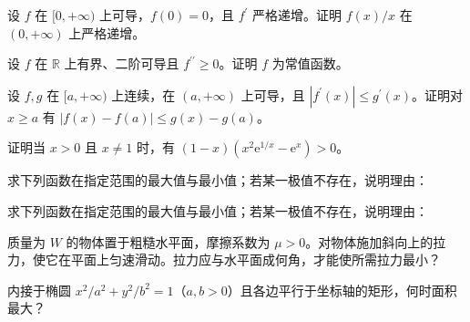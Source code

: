 \noindent\begin{minipage}{\textwidth}
设 $f$ 在 $[0,+\infty)$ 上可导，$f(0)=0$，且 $f^{\prime}$ 严格递增。证明 $f(x)/x$ 在 $(0,+\infty)$ 上严格递增。
\end{minipage}\par\vfill
\noindent\begin{minipage}{\textwidth}
设 $f$ 在 $\mathbb R$ 上有界、二阶可导且 $f^{\prime\prime}\ge0$。证明 $f$ 为常值函数。
\end{minipage}\par\vfill
\newpage
\noindent\begin{minipage}{\textwidth}
设 $f,g$ 在 $[a,+\infty)$ 上连续，在 $(a,+\infty)$ 上可导，且 $|f^{\prime}(x)|\le g^{\prime}(x)$。证明对 $x\ge a$ 有 $|f(x)-f(a)|\le g(x)-g(a)$。
\end{minipage}\par\vfill
\noindent\begin{minipage}{\textwidth}
证明当 $x>0$ 且 $x\ne1$ 时，有 $(1-x)(x^2\mathrm e^{1/x}-\mathrm e^x)>0$。
\end{minipage}\par\vfill
\noindent\begin{minipage}{\textwidth}
求下列函数在指定范围的最大值与最小值；若某一极值不存在，说明理由：
\end{minipage}\par\vfill
\newpage
\noindent\begin{minipage}{\textwidth}
求下列函数在指定范围的最大值与最小值；若某一极值不存在，说明理由：
\end{minipage}\par\vfill
\noindent\begin{minipage}{\textwidth}
质量为 $W$ 的物体置于粗糙水平面，摩擦系数为 $\mu>0$。对物体施加斜向上的拉力，使它在平面上匀速滑动。拉力应与水平面成何角，才能使所需拉力最小？
\end{minipage}\par\vfill
\noindent\begin{minipage}{\textwidth}
内接于椭圆 $x^2/a^2+y^2/b^2=1$（$a,b>0$）且各边平行于坐标轴的矩形，何时面积最大？
\end{minipage}\par\vfill
